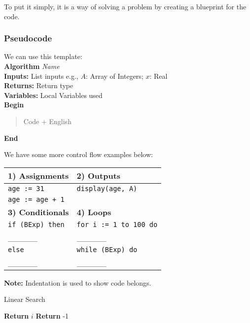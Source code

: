 \documentclass[a4paper,12pt]{article}
\begin{document}
To put it simply, it is a way of solving a problem by creating a blueprint for the code.

\subsubsection{Pseudocode}

We can use this template:\\

\noindent\textbf{Algorithm} \textit{Name} \\
\textbf{Inputs:} List inputs e.g., $A$: Array of Integers; $x$: Real \\
\textbf{Returns:} Return type \\
\textbf{Variables:} Local Variables used \\

\noindent\textbf{Begin}
\begin{quote}
    Code + English
\end{quote}
\textbf{End}

\begin{center}
    We have some more control flow examples below:
\end{center}

\begin{center}
\begin{tabular}{|p{6cm}|p{6cm}|}
\hline
\textbf{1) Assignments} & \textbf{2) Outputs} \\ \hline
\texttt{age := 31} & \texttt{display(age, A)} \\
\texttt{age := age + 1} & \\ \hline
\textbf{3) Conditionals} & \textbf{4) Loops} \\ \hline
\texttt{if (BExp) then} & \texttt{for i := 1 to 100 do} \\
\_\_\_\_\_ & \_\_\_\_\_ \\
\texttt{else} & \texttt{while (BExp) do} \\
\_\_\_\_\_ & \_\_\_\_\_ \\ \hline
\end{tabular}
\end{center}

\noindent\textbf{Note:} Indentation is used to show code belongs.

\begin{algorithm}[H]
\caption{Linear Search}
\begin{algorithmic}[1]
            \State \textbf{Return} $i$ 
        \EndIf
    \EndFor
    \State \textbf{Return} -1 
\EndProcedure
\end{algorithmic}
\end{algorithm}
\end{document}
